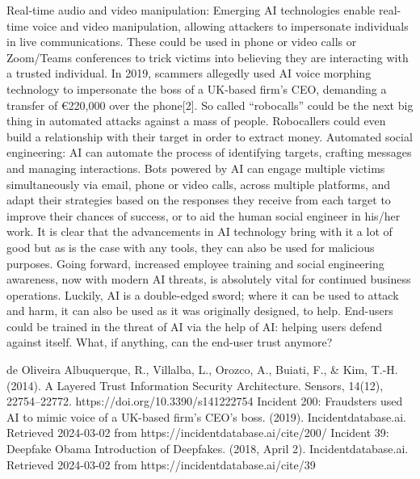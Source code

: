 Real-time audio and video manipulation: Emerging AI technologies enable real-time voice and video manipulation, allowing attackers to impersonate individuals in live communications. These could be used in phone or video calls or Zoom/Teams conferences to trick victims into believing they are interacting with a trusted individual. In 2019, scammers allegedly used AI voice morphing technology to impersonate the boss of a UK-based firm’s CEO, demanding a transfer of €220,000 over the phone[2]. So called “robocalls” could be the next big thing in automated attacks against a mass of people. Robocallers could even build a relationship with their target in order to extract money.
Automated social engineering: AI can automate the process of identifying targets, crafting messages and managing interactions. Bots powered by AI can engage multiple victims simultaneously via email, phone or video calls, across multiple platforms, and adapt their strategies based on the responses they receive from each target to improve their chances of success, or to aid the human social engineer in his/her work.
It is clear that the advancements in AI technology bring with it a lot of good but as is the case with any tools, they can also be used for malicious purposes. Going forward, increased employee training and social engineering awareness, now with modern AI threats, is absolutely vital for continued business operations. Luckily, AI is a double-edged sword; where it can be used to attack and harm, it can also be used as it was originally designed, to help. End-users could be trained in the threat of AI via the help of AI: helping users defend against itself.
What, if anything, can the end-user trust anymore?

de Oliveira Albuquerque, R., Villalba, L., Orozco, A., Buiati, F., & Kim, T.-H. (2014). A Layered Trust Information Security Architecture. Sensors, 14(12), 22754–22772. https://doi.org/10.3390/s141222754 
Incident 200: Fraudsters used AI to mimic voice of a UK-based firm’s CEO’s boss. (2019). Incidentdatabase.ai. Retrieved 2024-03-02 from https://incidentdatabase.ai/cite/200/ 
Incident 39: Deepfake Obama Introduction of Deepfakes. (2018, April 2). Incidentdatabase.ai. Retrieved 2024-03-02 from https://incidentdatabase.ai/cite/39 